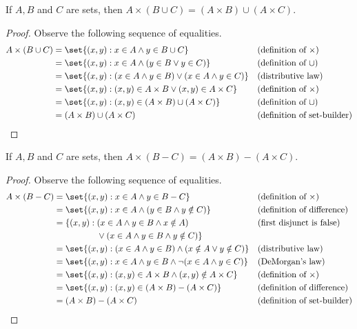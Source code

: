 \documentclass[DIN, pagenumber=false, fontsize=11pt, parskip=half]{scrartcl}
\begin{document}
\begin{problems}
    \problem If $A,B$ and $C$ are sets, then $A \times (B \cup C) = (A \times B) \cup (A \times C)$.
    \begin{proof}
        Observe the following sequence of equalities.
        \begin{align*}
            A \times (B \cup C) & = \set{(x,y) : x \in A \land y \in B \cup C} && \text{(definition of $\times$)}\\
                                & = \set{(x,y) : x \in A \land (y \in B \lor y \in C)} && \text{(definition of $\cup$)}\\ 
                                & = \set{(x,y) : (x \in A \land y \in B) \lor (x \in A \land y \in C)} && \text{(distributive law)}\\ 
                                & = \set{(x,y) : (x,y) \in A \times B \lor (x,y) \in A \times C} && \text{(definition of $\times$)}\\
                                & = \set{(x,y) : (x,y) \in (A \times B) \cup (A \times C)} && \text{(definition of $\cup$)}\\ 
                                & = (A \times B) \cup (A \times C) && \text{(definition of set-builder)}
        \end{align*}
    \end{proof}

    \problem If $A,B$ and $C$ are sets, then $A \times (B - C) = (A \times B) - (A \times C)$.
    \begin{proof}
        Observe the following sequence of equalities.
        \begin{align*}
            A \times (B - C) & = \set{(x,y) : x \in A \land y \in B-C} && \text{(definition of $\times$)}\\ 
                             & = \set{(x,y) : x \in A \land (y \in B \land y \notin C)} && \text{(definition of difference)}\\
                             & = \{(x,y) : (x \in A \land y \in B \land x \notin A) && \text{(first disjunct is false)}\\
                             & \hphantom{{}= \{(x,y) :{}} \lor (x \in A \land y \in B \land y \notin C)\}\\
                             & = \set{(x,y) : (x \in A \land y \in B) \land (x \notin A \lor y \notin C)} && \text{(distributive law)}\\
                             & = \set{(x,y) : x \in A \land y \in B \land \lnot(x \in A \land y \in C)} && \text{(DeMorgan's law)}\\
                             & = \set{(x,y) : (x,y) \in A \times B \land (x,y) \notin A \times C} && \text{(definition of $\times$)}\\
                             & = \set{(x,y) : (x,y) \in (A \times B) - (A \times C)} && \text{(definition of difference)}\\
                             & = (A \times B) - (A \times C) && \text{(definition of set-builder)}
        \end{align*}
    \end{proof}


\end{problems}
\end{document}
